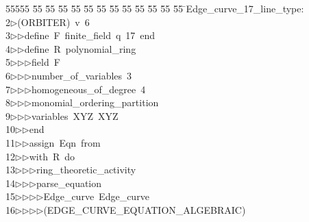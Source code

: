 %
%
\begin{tabbing}
55555 \= 55 \= 55 \= 55 \= 55 \= 55 \= 55 \= 55 \= 55 \= 55 \= 55 \= 55 \= 55 \= \>Edge\_curve\_17\_line\_type:\\[0pt]
2\>$\triangleright$\>(ORBITER)\ v\ 6\ \\[0pt]
3\>$\triangleright$\>$\triangleright$\>define\ F\ finite\_field\ q\ 17\ end\ \\[0pt]
4\>$\triangleright$\>$\triangleright$\>define\ R\ polynomial\_ring\ \\[0pt]
5\>$\triangleright$\>$\triangleright$\>$\triangleright$\>field\ F\ \\[0pt]
6\>$\triangleright$\>$\triangleright$\>$\triangleright$\>number\_of\_variables\ 3\ \\[0pt]
7\>$\triangleright$\>$\triangleright$\>$\triangleright$\>homogeneous\_of\_degree\ 4\ \\[0pt]
8\>$\triangleright$\>$\triangleright$\>$\triangleright$\>monomial\_ordering\_partition\ \\[0pt]
9\>$\triangleright$\>$\triangleright$\>$\triangleright$\>variables\ XYZ\ XYZ\ \\[0pt]
10\>$\triangleright$\>$\triangleright$\>end\ \\[0pt]
11\>$\triangleright$\>$\triangleright$\>assign\ Eqn\ from\ \\[0pt]
12\>$\triangleright$\>$\triangleright$\>with\ R\ do\ \\[0pt]
13\>$\triangleright$\>$\triangleright$\>$\triangleright$\>ring\_theoretic\_activity\ \\[0pt]
14\>$\triangleright$\>$\triangleright$\>$\triangleright$\>parse\_equation\ \\[0pt]
15\>$\triangleright$\>$\triangleright$\>$\triangleright$\>$\triangleright$\>Edge\_curve\ Edge\_curve\ \\[0pt]
16\>$\triangleright$\>$\triangleright$\>$\triangleright$\>$\triangleright$\>(EDGE\_CURVE\_EQUATION\_ALGEBRAIC)\ \\[0pt]

\end{tabbing}
